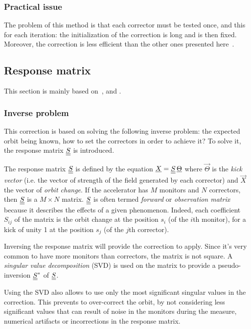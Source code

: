 \subsubsection{Practical issue}
The problem of this method is that each corrector must be tested once, and this for each iteration: the initialization of the correction is long and is then fixed. Moreover, the correction is less efficient than the other ones presented here~\cite{book:wille}.

\subsection{Response matrix}
\label{sec:response_matrix}
This section is mainly based on~\cite{book:wille}, \cite{art:decker-1991} and \cite{art:plouviez-1999}.

\subsubsection{Inverse problem}
This correction is based on solving the following inverse problem: the expected orbit being known, how to set the correctors in order to achieve it? To solve it, the response matrix $\underline{\underline{S}}$ is introduced.

The response matrix $\underline{\underline{S}}$ is defined by the equation $\underline{X} = \underline{\underline{S}}\, \underline{\Theta}$ where $\vec{\Theta}$ is the \emph{kick vector} (i.e. the vector of strength of the field generated by each corrector) and $\vec{X}$ the vector of \emph{orbit change}. If the accelerator has $M$ monitors and $N$ correctors, then $\underline{\underline{S}}$ is a $M \times N$ matrix. $\underline{\underline{S}}$ is often termed \emph{forward} or \emph{observation matrix} because it describes the effects of a given phenomenon. Indeed, each coefficient $S_{ij}$ of the matrix is the orbit change at the position $s_i$ (of the $i$th monitor), for a kick of unity 1 at the position $s_j$ (of the $j$th corrector).

Inversing the response matrix will provide the correction to apply. Since it's very common to have more monitors than correctors, the matrix is not square. A \emph{singular value decomposition} (SVD) is used on the matrix to provide a pseudo-inversion $\underline{\underline{S}}^*$ of $\underline{\underline{S}}$.

Using the SVD also allows to use only the most significant singular values in the correction. This prevents to over-correct the orbit, by not considering less significant values that can result of noise in the monitors during the measure, numerical artifacts or incorrections in the response matrix.

